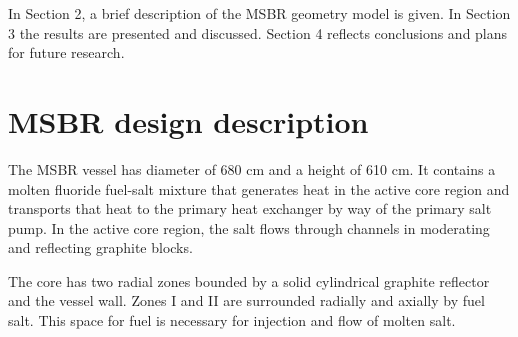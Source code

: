 \documentclass{anstrans}
\begin{document}
In Section 2, a brief description of the \gls{MSBR} geometry model is given. In 
Section 3 the results are presented and discussed. Section 4 reflects 
conclusions and plans for future research.  

\section{MSBR design description}
The \gls{MSBR} vessel has diameter of 680 cm and a height of 610 cm. It 
contains a molten fluoride fuel-salt mixture that generates heat in the active 
core region and transports that heat to the primary heat exchanger by way of 
the primary salt pump.
In the active core region, the salt flows through channels in moderating and 
reflecting graphite blocks.

The core has two radial zones bounded by a solid cylindrical graphite reflector 
and the vessel wall.  Zones I and II are surrounded radially and axially by 
fuel salt. This space for fuel is necessary for injection and flow of molten 
salt.
\end{document}
